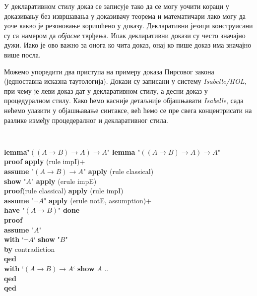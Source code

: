 У декларативном стилу доказ се записује тако да се могу уочити кораци
у доказивању без извршавања у доказивачу теорема и математичари лако
могу да уоче какво је резоновање коришћено у доказу. Декларативни
језици конструисани су са намером да \emph{објасне} тврђења. Ипак
декларативни докази су често значајно дужи. Иако је ово важно за онога
ко чита доказ, онај ко пише доказ има значајно више посла. 

Можемо упоредити два приступа на примеру доказа Пирсовог закона
(једноставна исказна таутологија). Докази су записани у систему
\emph{Isabelle/HOL}, при чему је леви доказ дат у декларативном стилу,
а десни доказ у процедуралном стилу. Како ћемо касније детаљније
објашњавати \emph{Isabelle}, сада нећемо улазити у објашњавање
синтаксе, већ ћемо се пре свега концентрисати на разлике између
процедералног и декларативног стила.

\begin{small}
{\tt
\begin{tabbing}
\textbf{lem}\=\textbf{ma}\= "$((A \longrightarrow B) \longrightarrow A) \longrightarrow A$"  \hspace{1.5cm}  \= \textbf{lemma} "$((A \longrightarrow B) \longrightarrow A) \longrightarrow A$" \\
\textbf{proof}                                                                                           \>\>\> \textbf{apply} (rule impI)+  \\
\> \textbf{assume} "$(A \longrightarrow B) \longrightarrow A$"                                           \>\>   \textbf{apply} (rule classical)  \\
\> \textbf{show} "$A$"                                                                                   \>\>   \textbf{apply} (erule impE) \\
\> \textbf{proof}(rule classical)                                                                        \>\>   \textbf{apply} (rule impI)  \\
\>\>   \textbf{assume} "$\neg A$"                                                                        \>     \textbf{apply} (erule notE, assumption)+  \\
\>\>   \textbf{have} "$(A \longrightarrow B)$"                                                           \>     \textbf{done} \\
\>\>   \textbf{pro}\=\textbf{of}  \\
\>\>\> \textbf{assume} "$A$"  \\
\>\>\> \textbf{with} `$\neg A$` \textbf{show} "$B$" \\
\>\>\> \textbf{by} contradiction \\
\>\>   \textbf{qed}  \\
\>\>   \textbf{with} `$(A \longrightarrow B) \longrightarrow A$` \textbf{show} $A$ .. \\
\>  \textbf{qed} \\
\textbf{qed}
\end{tabbing}
}
\end{small}

